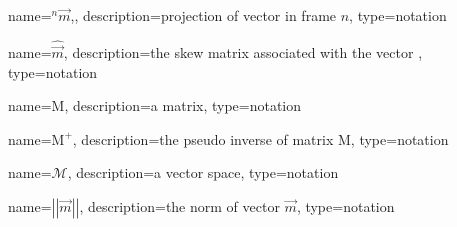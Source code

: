 	\newcommand{\project}[2]{\ensuremath{{}^{#2}\!{#1}}}
	{%
		name=\project{\vec{m}}{n},,
		description=projection of vector  in frame $n$,
		type=notation
	}

	\newcommand{\skewmat}[1]{\ensuremath{\widehat{#1}}}
	{%
		name=\skewmat{\vec{m}},
		description=the skew matrix associated with the vector ,
		type=notation
	}

	\newcommand{\mat}[1]{\ensuremath{\boldsymbol{\mathrm{#1}}}}
	{%
		name=\mat{M},
		description=a matrix,
		type=notation
	}

	\newcommand{\pseudoinv}[1]{\ensuremath{{#1}^{+}}}
	{%
		name=\pseudoinv{\mat{M}},
		description=the pseudo inverse of matrix \mat{M},
		type=notation
	}

	\newcommand{\vecspace}[1]{\ensuremath{\mathscr{#1}}}
	{%
		name=\vecspace{M},
		description=a vector space,
		type=notation
	}

	\newcommand{\norm}[1]{\ensuremath{\left|\left|#1\right|\right|}}
	{%
		name=\norm{\vec{m}},
		description=the norm of vector $\vec{m}$,
		type=notation
	}

